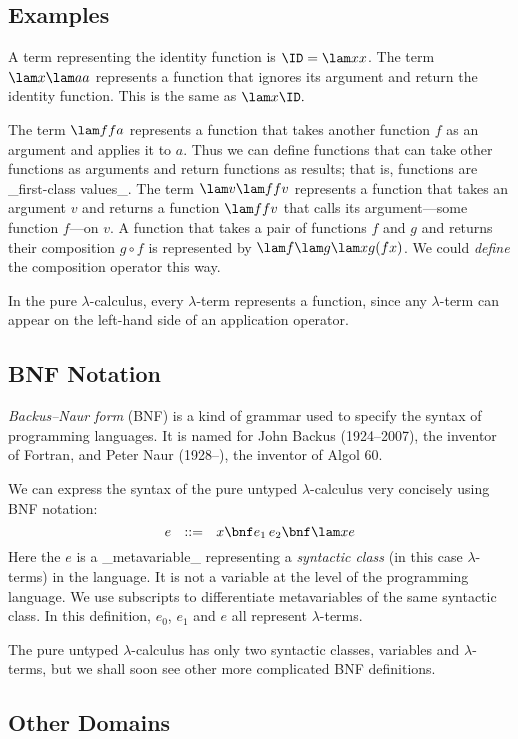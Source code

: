 \subsection{Examples}

A term representing the identity function is $\ID = \lam xx$.
The term $\lam x {\lam aa}$ represents a function that ignores its argument and return the identity function.
This is the same as $\lam x\ID.$

The term $\lam f{fa}$ represents a function that takes another function $f$ as
an argument and applies it to $a$. Thus we can define functions that can take other functions
as arguments and return functions as results; that is, functions are _first-class values_.
The term $\lam v{\lam f{fv}}$
represents a function that takes an argument $v$ and returns a function $\lam f{fv}$
that calls its argument---some function $f$---on $v$. A function that takes a pair of functions $f$ and $g$ 
and returns their composition $g\circ f$ is represented by $\lam f{\lam g{\lam x{g(fx)}}}$.
We could \emph{define} the composition operator this way.

In the pure $\lambda$-calculus, every $\lambda$-term represents a function, since any $\lambda$-term
can appear on the left-hand side of an application operator. 

\subsection{BNF Notation}

\emph{Backus--Naur form} (BNF) is a kind of grammar used to specify the
syntax of programming languages. It is named for
John Backus (1924--2007), the inventor of Fortran, and Peter Naur (1928--),
the inventor of Algol 60.

We can express the syntax of the pure untyped $\lambda$-calculus very concisely
using BNF notation:
\[
e\ \ ::=\ \ x \bnf e_1\,e_2 \bnf \lam xe
\]
Here the $e$ is a _metavariable_ representing a \emph{syntactic class}
(in this case $\lambda$-terms) in the language. It is not a variable at the level
of the programming language. We use subscripts to differentiate
metavariables of the same syntactic class. In this definition, $e_0$, $e_1$ and
$e$ all represent $\lambda$-terms.

The pure untyped $\lambda$-calculus has only
two syntactic classes, variables and $\lambda$-terms, but we shall soon
see other more complicated BNF definitions.

\subsection{Other Domains}

